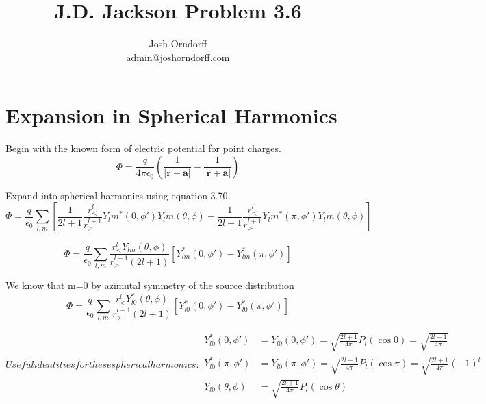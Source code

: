 \documentclass[10pt,a4paper]{article}
\begin{document}
\title{J.D. Jackson Problem 3.6}
\author{Josh Orndorff \\ admin@joshorndorff.com}
\maketitle

\section{Expansion in Spherical Harmonics}

Begin with the known form of electric potential for point charges.
\begin{equation}
\Phi=\frac{q}{4\pi\epsilon_0}\left(\frac{1}{|\mathbf{r}-\mathbf{a}|}-\frac{1}{|\mathbf{r}+\mathbf{a}|}\right)
\end{equation}

Expand into spherical harmonics using equation 3.70.
\begin{equation}
\Phi=\frac{q}{\epsilon_0}\sum_{l,m}\left[
\frac{1}{2l+1}\frac{r_<^l}{r_>^{l+1}}Y_lm^*(0,\phi')Y_lm(\theta,\phi)-
\frac{1}{2l+1}\frac{r_<^l}{r_>^{l+1}}Y_lm^*(\pi,\phi')Y_lm(\theta,\phi)
\right]
\end{equation}

\begin{equation}
\Phi=\frac{q}{\epsilon_0}\sum_{l,m}
\frac{r_<^l Y_{lm}(\theta,\phi)}{r_>^{l+1} (2l+1)}
\left[Y_{lm}^*(0,\phi')-Y_{lm}^*(\pi,\phi')
\right]
\end{equation}

We know that m=0 by azimutal symmetry of the source distribution
\begin{equation}
\Phi=\frac{q}{\epsilon_0}\sum_{l,m}
\frac{r_<^l Y_{l0}^*(\theta,\phi)}{r_>^{l+1} (2l+1)}
\left[Y_{l0}^*(0,\phi')-Y_{l0}^*(\pi,\phi')
\right]
\end{equation}

\begin{subequations}
Useful identities for these spherical harmonics:
\begin{align}
        Y_{l0}^*(0,\phi')&=Y_{l0}(0,\phi')=\sqrt{\frac{2l+1}{4\pi}}P_l(\cos0)=\sqrt{\frac{2l+1}{4\pi}}\\
        Y_{l0}^*(\pi,\phi')&=Y_{l0}(\pi,\phi')=\sqrt{\frac{2l+1}{4\pi}}P_l(\cos\pi)=\sqrt{\frac{2l+1}{4\pi}}(-1)^l\\
        Y_{l0}(\theta,\phi)&=\sqrt{\frac{2l+1}{4\pi}}P_l(\cos\theta)
\end{align}
\end{subequations}
\end{document}
